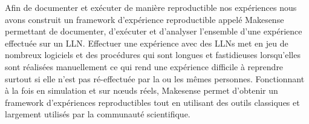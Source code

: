 {Afin de documenter et exécuter de manière reproductible nos expériences nous avons construit un framework d'expérience reproductible appelé Makesense permettant de documenter, d'exécuter et d'analyser l'ensemble d'une expérience effectuée sur un \ac{LLN}.
Effectuer une expérience avec des \ac{LLN}s met en jeu de nombreux logiciels et des procédures qui sont longues et fastidieuses lorsqu'elles sont réalisées manuellement ce qui rend une expérience difficile à reprendre surtout si elle n'est pas ré-effectuée par la ou les mêmes personnes.
Fonctionnant à la fois en simulation et sur nœuds réels, Makesense permet d'obtenir un framework d'expériences reproductibles tout en utilisant des outils classiques et largement utilisés par la communauté scientifique.
}

\resumefr

\endgroup

\vfill